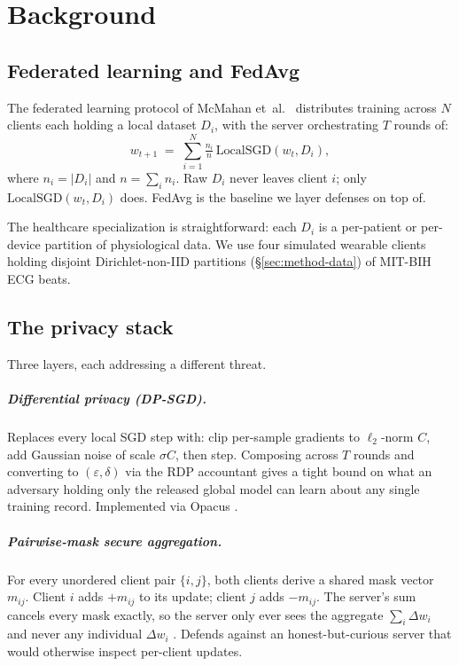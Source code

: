 \documentclass[11pt,a4paper]{report}
\begin{document}
\chapter{Background}\label{ch:bg}

\section{Federated learning and FedAvg}

The federated learning protocol of McMahan et~al.~\cite{mcmahan2017fedavg}
distributes training across $N$ clients each holding a local dataset $D_i$,
with the server orchestrating $T$ rounds of:
$$
w_{t+1} \;=\; \sum_{i=1}^{N} \tfrac{n_i}{n}\, \mathrm{LocalSGD}(w_t, D_i),
$$
where $n_i = |D_i|$ and $n = \sum_i n_i$. Raw $D_i$ never leaves client $i$;
only $\mathrm{LocalSGD}(w_t, D_i)$ does. FedAvg is the baseline we layer
defenses on top of.

The healthcare specialization is straightforward: each $D_i$ is a per-patient
or per-device partition of physiological data. We use four simulated wearable
clients holding disjoint Dirichlet-non-IID partitions
(\S\ref{sec:method-data}) of MIT-BIH ECG beats.

\section{The privacy stack}

Three layers, each addressing a different threat.

\paragraph{Differential privacy (DP-SGD).}
Replaces every local SGD step with: clip per-sample gradients to
$\ell_2$-norm $C$, add Gaussian noise of scale $\sigma C$, then step.
Composing across $T$ rounds and converting to $(\varepsilon, \delta)$ via the
RDP accountant \cite{mironov2017rdp} gives a tight bound on what an
adversary holding only the released global model can learn about any
single training record. Implemented via Opacus \cite{yousefpour2021opacus}.

\paragraph{Pairwise-mask secure aggregation.}
For every unordered client pair $\{i,j\}$, both clients derive a shared mask
vector $m_{ij}$. Client $i$ adds $+m_{ij}$ to its update; client $j$ adds
$-m_{ij}$. The server's sum cancels every mask exactly, so the server only ever
sees the aggregate $\sum_i \Delta w_i$ and never any individual $\Delta w_i$
\cite{bonawitz2017secagg}. Defends against an honest-but-curious server that
would otherwise inspect per-client updates.
\end{document}
